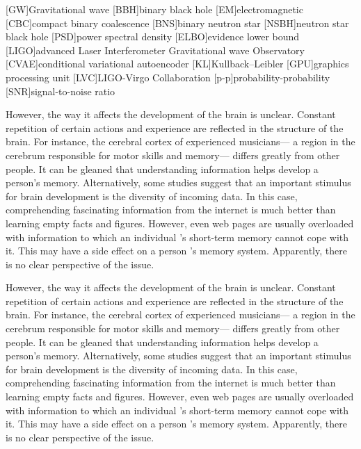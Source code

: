 \documentclass[aps,superscriptaddress,twocolumn,nopreprintnumbers,floatfix,groupedaddress]{revtex4-1}
\begin{document}
[GW]{Gravitational wave}
[BBH]{binary black hole}
[EM]{electromagnetic}
[CBC]{compact binary coalescence}
[BNS]{binary neutron star}
[NSBH]{neutron star black hole}
[PSD]{power spectral density}
[ELBO]{evidence lower bound}
[LIGO]{advanced Laser Interferometer Gravitational wave Observatory}
[CVAE]{conditional variational autoencoder}
[KL]{Kullback--Leibler}
[GPU]{graphics processing unit}
[LVC]{LIGO-Virgo Collaboration}
[p-p]{probability-probability}
[SNR]{signal-to-noise ratio}

\break
\pagebreak

However, the way it affects the development of the brain is unclear. Constant repetition of certain actions and experience are reflected in the structure of the brain. For instance, the cerebral cortex of experienced musicians— a region in the cerebrum responsible for motor skills and memory— differs greatly from other people. It can be gleaned that understanding information helps develop a person’s memory. Alternatively, some studies suggest that an important stimulus for brain development is the diversity of incoming data. In this case, comprehending fascinating information from the internet is much better than learning empty facts and figures. However, even web pages are usually overloaded with information to which an individual ’s short-term memory cannot cope with it. This may have a side effect on a person ’s memory system. Apparently, there is no clear perspective of the issue.



However, the way it affects the development of the brain is unclear. Constant repetition of certain actions and experience are reflected in the structure of the brain. For instance, the cerebral cortex of experienced musicians— a region in the cerebrum responsible for motor skills and memory— differs greatly from other people. It can be gleaned that understanding information helps develop a person’s memory. Alternatively, some studies suggest that an important stimulus for brain development is the diversity of incoming data. In this case, comprehending fascinating information from the internet is much better than learning empty facts and figures. However, even web pages are usually overloaded with information to which an individual ’s short-term memory cannot cope with it. This may have a side effect on a person ’s memory system. Apparently, there is no clear perspective of the issue.
\end{document}

